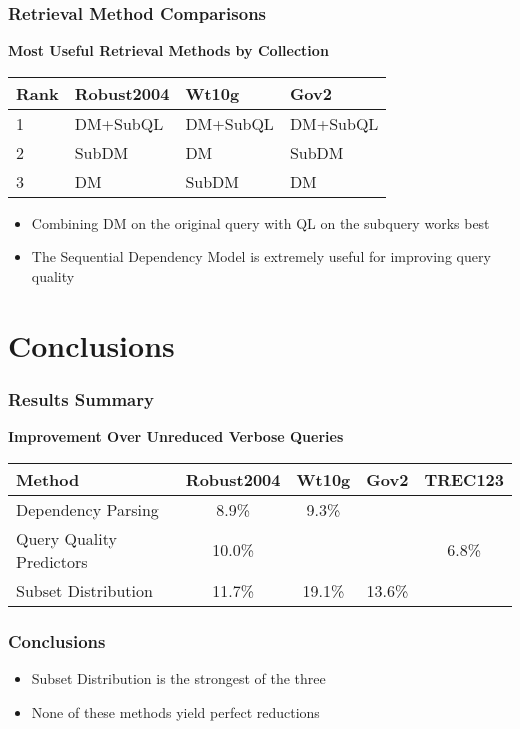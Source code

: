 \documentclass{beamer}
\begin{document}
\begin{frame}[fragile]\frametitle{Retrieval Method Comparisons}
\begin{center}
\textbf{Most Useful Retrieval Methods by Collection}
\begin{tabular}{| l | p{2cm} | p{2cm} | p{2cm} |}
\hline
\small{\textbf{Rank}} & \small{\textbf{Robust2004}} & \small{\textbf{Wt10g}} & \small{\textbf{Gov2}} \\ \hline
1 & DM+SubQL & DM+SubQL & DM+SubQL \\ \hline
2 & SubDM & DM & SubDM \\ \hline
3 & DM & SubDM & DM \\
\hline
\end{tabular}
\end{center}
\begin{itemize}
\item Combining DM on the original query with QL on the subquery works best
\item The Sequential Dependency Model is extremely useful for improving query quality
\end{itemize}
\end{frame}

\section{Conclusions}

\begin{frame}[fragile]\frametitle{Results Summary}
\begin{center}
\textbf{Improvement Over Unreduced Verbose Queries}
\begin{tabular}{| p{2cm} | c | c | c | c |}
\hline
Method & \small{\textbf{Robust2004}} & \small{\textbf{Wt10g}} & \small{\textbf{Gov2}} & \small{\textbf{TREC123}} \\ \hline
Dependency Parsing & 8.9\% & 9.3\% &  &  \\ \hline
Query Quality Predictors & 10.0\% &  &  & 6.8\% \\ \hline
Subset \linebreak Distribution & 11.7\% & 19.1\% & 13.6\% &  \\
\hline
\end{tabular}
\end{center}
\end{frame}

\begin{frame}[fragile]\frametitle{Conclusions}
\begin{itemize}
\item Subset Distribution is the strongest of the three
\item None of these methods yield perfect reductions
\end{itemize}
\end{frame}
\end{document}
